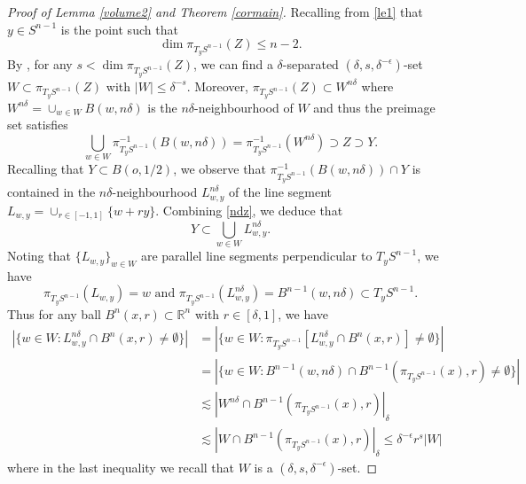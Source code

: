 \documentclass[11pt,a4paper,reqno]{amsart}
\newcommand{\R}{\mathbb{R}}
\newcommand{\calC}{\mathcal{C}}
\newcommand{\1}{\mathbf{1}}
\numberwithin{equation}{section}
\theoremstyle{plain}
\theoremstyle{definition}
\theoremstyle{remark}
\begin{document}
\begin{proof}[Proof of Lemma \ref{volume2} and Theorem \ref{cormain}]
Recalling from \eqref{le1} that $y \in S^{n-1}$ is the point such that
    $$ \dim \pi_{T_yS^{n-1}}(Z) \le n-2.$$
By \cite[Lemma 2.7]{orponen2023hausdorff}, for any $s < \dim \pi_{T_yS^{n-1}}(Z)$, we can find a $\delta$-separated $(\delta,s,\delta^{-\epsilon})$-set $W \subset \pi_{T_yS^{n-1}}(Z)$ with $|W| \le \delta^{-s}$. Moreover, $\pi_{T_yS^{n-1}}(Z) \subset W^{n\delta}$ where $W^{n\delta}= \cup_{w \in W} B(w, n \delta)$ is the $n\delta$-neighbourhood of $W$ and thus the preimage set satisfies
\begin{equation}\label{ndz}
  \bigcup_{w \in W}\pi_{T_yS^{n-1}}^{-1}(B(w,n\delta)) = \pi_{T_yS^{n-1}}^{-1}(W^{n\delta})  \supset Z \supset Y.
\end{equation}
Recalling that $Y \subset B(o,1/2)$, we observe that $\pi_{T_yS^{n-1}}^{-1}(B(w,n\delta))\cap Y$ is contained in the $n\delta$-neighbourhood $L_{w,y}^{n\delta}$ of the line segment $L_{w,y}= \cup_{r \in [-1,1]} \{w + ry\}$.
Combining \eqref{ndz}, we deduce that
\begin{equation}\label{incly}
  Y \subset   \bigcup_{w \in W}L_{w,y}^{n\delta}.
\end{equation}
Noting that $\{L_{w,y}\}_{w \in W}$ are parallel line segments perpendicular to $T_yS^{n-1}$, we have
$$ \pi_{T_yS^{n-1}}(L_{w,y}) = w \mbox{ and } \pi_{T_yS^{n-1}}(L_{w,y}^{n\delta}) = B^{n-1}(w,n\delta) \subset T_yS^{n-1}. $$
Thus for any ball $B^n(x,r) \subset \R^n$ with $r \in [\delta,1]$, we have
\begin{align*}
  |\{w \in W: L_{w,y}^{n\delta} \cap B^n(x,r) \ne \emptyset\}| & = |\{w \in W: \pi_{T_yS^{n-1}}[L_{w,y}^{n\delta} \cap B^n(x,r)] \ne \emptyset\}| \\
   & =|\{w \in W: B^{n-1}(w,n\delta) \cap B^{n-1}(\pi_{T_yS^{n-1}}(x),r) \ne \emptyset\}| \\
   & \lesssim |W^{n\delta} \cap B^{n-1}(\pi_{T_yS^{n-1}}(x),r)|_{\delta} \\
   & \lesssim |W \cap B^{n-1}(\pi_{T_yS^{n-1}}(x),r)|_{\delta} \le \delta^{-\epsilon}r^s|W|
\end{align*}
where in the last inequality we recall that $W$ is a $(\delta,s,\delta^{-\epsilon})$-set.


\end{proof}
\end{document}

